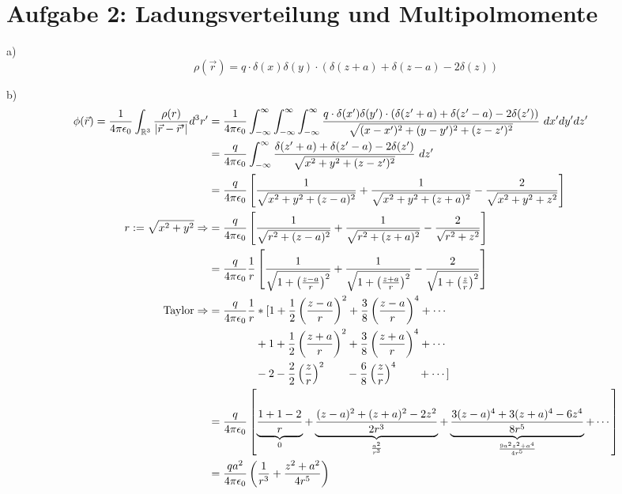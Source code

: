 \documentclass[11pt a4paper]{article}
\newcommand{\epsz}{\epsilon_0}
\begin{document}
\section*{Aufgabe 2: Ladungsverteilung und Multipolmomente}
\quad \par{a)}
\[
	\rho (\vec r) = q \cdot \delta(x) \delta(y) \cdot \left(
	\delta(z+a) + \delta(z-a) - 2\delta(z) \right)
\]
\par{b)}
\begin{align*}
	\phi(\vec r) = \frac1{4\pi\epsz} \int_{\mathbb{R}^3} 
	\frac{\rho(r)}{\vert \vec r - \vec r^\prime \vert} d^3r^\prime
	&= \frac{1}{4\pi\epsz} 
	\int_{-\infty}^\infty
	\int_{-\infty}^\infty
	\int_{-\infty}^\infty
	\frac{
	q \cdot \delta(x^\prime) \delta(y^\prime) \cdot \left(
	\delta(z^\prime+a) + \delta(z^\prime-a) - 2\delta(z^\prime) \right)}
	{\sqrt{(x-x^\prime)^2 +(y-y^\prime)^2 + (z-z^\prime)^2}}
	\ dx^\prime dy^\prime dz^\prime \\
	&= \frac{q}{4\pi\epsz} 
	\int_{-\infty}^\infty 
	\frac{\delta(z^\prime+a) + \delta(z^\prime-a) - 2\delta(z^\prime)}
	{\sqrt{x^2 + y^2 + (z - z^\prime)^2}}
	\ dz^\prime \\
	&= \frac{q}{4\pi\epsz} \left[
		\frac{1}{\sqrt{x^2 + y^2 + (z-a)^2}} + 
		\frac{1}{\sqrt{x^2 + y^2 + (z+a)^2}} -
		\frac{2}{\sqrt{x^2 + y^2 + z^2}}  
	\right] \\
	r := \sqrt{x^2 + y^2}
	\Rightarrow
	&= \frac{q}{4\pi\epsz} \left[
		\frac{1}{\sqrt{r^2 + (z-a)^2}} + 
		\frac{1}{\sqrt{r^2 + (z+a)^2}} -
		\frac{2}{\sqrt{r^2 + z^2}}  
	\right] \\
	&= \frac{q}{4\pi\epsz} \frac1r \left[
		\frac{1}{\sqrt{1 + \left( \frac{z-a}{r} \right)^2}} +
		\frac{1}{\sqrt{1 + \left( \frac{z+a}{r} \right)^2}} -
		\frac{2}{\sqrt{1 + \left( \frac{z}{r} \right)^2}} 
	\right] \\
	\text{Taylor} \Rightarrow
	&= \frac{q}{4\pi\epsz} \frac1r * [
			1 + \frac{1}{2} \left(\frac{z-a}{r}\right)^2
			+ \frac{3}{8} \left(\frac{z-a}{r}\right)^4
			+  \dotsb \\
			&\hspace{1.49cm} +
			1 + \frac{1}{2} \left(\frac{z+a}{r}\right)^2
			+ \frac{3}{8} \left(\frac{z+a}{r}\right)^4
			+  \dotsb \\
			&\hspace{1.49cm} -
			2 - \frac{2}{2} \left(\frac{z}{r}\right)^2
			\hspace{0.7cm}
			-\frac{6}{8} \left(\frac{z}{r}\right)^4
			\hspace{0.7cm} +  \dotsb] \\
	&= \frac{q}{4\pi\epsz} \left[
		\underbrace{\frac{1+1-2}{r}}_{0} +
		\underbrace{\frac{(z-a)^2 + (z+a)^2 - 2z^2}{2 r^3}}_{
			\frac{a^2}{r^3}}
		+ 
		\underbrace{\frac{3 (z-a)^4 + 3 (z+a)^4 - 6 z^4}{8 r^5}}_{
			\frac{9a^2 z^2 + a^4}{4r^5}} + \dotsb
		\right] \\
	&= \frac{q a^2}{4\pi\epsz} \left(
	\frac{1}{r^3} + \frac{z^2 + a^2}{4r^5} \right)
\end{align*}
\end{document}
